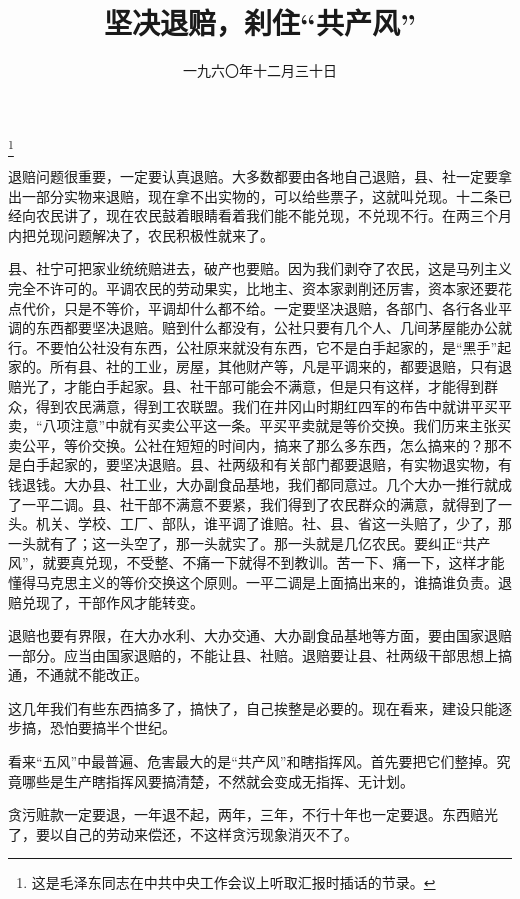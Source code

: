 
\title{坚决退赔，刹住“共产风”}
\date{一九六〇年十二月三十日}
\thanks{这是毛泽东同志在中共中央工作会议上听取汇报时插话的节录。}
\maketitle


退赔问题很重要，一定要认真退赔。大多数都要由各地自己退赔，县、社一定要拿出一部分实物来退赔，现在拿不出实物的，可以给些票子，这就叫兑现。十二条已经向农民讲了，现在农民鼓着眼睛看着我们能不能兑现，不兑现不行。在两三个月内把兑现问题解决了，农民积极性就来了。

县、社宁可把家业统统赔进去，破产也要赔。因为我们剥夺了农民，这是马列主义完全不许可的。平调农民的劳动果实，比地主、资本家剥削还厉害，资本家还要花点代价，只是不等价，平调却什么都不给。一定要坚决退赔，各部门、各行各业平调的东西都要坚决退赔。赔到什么都没有，公社只要有几个人、几间茅屋能办公就行。不要怕公社没有东西，公社原来就没有东西，它不是白手起家的，是“黑手”起家的。所有县、社的工业，房屋，其他财产等，凡是平调来的，都要退赔，只有退赔光了，才能白手起家。县、社干部可能会不满意，但是只有这样，才能得到群众，得到农民满意，得到工农联盟。我们在井冈山时期红四军的布告中就讲平买平卖，“八项注意”中就有买卖公平这一条。平买平卖就是等价交换。我们历来主张买卖公平，等价交换。公社在短短的时间内，搞来了那么多东西，怎么搞来的？那不是白手起家的，要坚决退赔。县、社两级和有关部门都要退赔，有实物退实物，有钱退钱。大办县、社工业，大办副食品基地，我们都同意过。几个大办一推行就成了一平二调。县、社干部不满意不要紧，我们得到了农民群众的满意，就得到了一头。机关、学校、工厂、部队，谁平调了谁赔。社、县、省这一头赔了，少了，那一头就有了；这一头空了，那一头就实了。那一头就是几亿农民。要纠正“共产风”，就要真兑现，不受整、不痛一下就得不到教训。苦一下、痛一下，这样才能懂得马克思主义的等价交换这个原则。一平二调是上面搞出来的，谁搞谁负责。退赔兑现了，干部作风才能转变。

退赔也要有界限，在大办水利、大办交通、大办副食品基地等方面，要由国家退赔一部分。应当由国家退赔的，不能让县、社赔。退赔要让县、社两级干部思想上搞通，不通就不能改正。

这几年我们有些东西搞多了，搞快了，自己挨整是必要的。现在看来，建设只能逐步搞，恐怕要搞半个世纪。

看来“五风”中最普遍、危害最大的是“共产风”和瞎指挥风。首先要把它们整掉。究竟哪些是生产瞎指挥风要搞清楚，不然就会变成无指挥、无计划。

贪污赃款一定要退，一年退不起，两年，三年，不行十年也一定要退。东西赔光了，要以自己的劳动来偿还，不这样贪污现象消灭不了。

